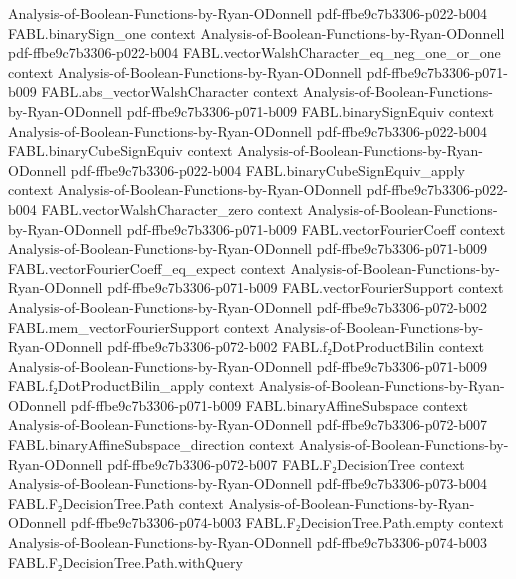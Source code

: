 \begin{theorem}
  {Analysis-of-Boolean-Functions-by-Ryan-ODonnell}
  {pdf-ffbe9c7b3306-p022-b004}
\proofstep
  {FABL.binarySign_one}
  {context}
  {Analysis-of-Boolean-Functions-by-Ryan-ODonnell}
  {pdf-ffbe9c7b3306-p022-b004}
\proofstep
  {FABL.vectorWalshCharacter_eq_neg_one_or_one}
  {context}
  {Analysis-of-Boolean-Functions-by-Ryan-ODonnell}
  {pdf-ffbe9c7b3306-p071-b009}
\proofstep
  {FABL.abs_vectorWalshCharacter}
  {context}
  {Analysis-of-Boolean-Functions-by-Ryan-ODonnell}
  {pdf-ffbe9c7b3306-p071-b009}
\proofstep
  {FABL.binarySignEquiv}
  {context}
  {Analysis-of-Boolean-Functions-by-Ryan-ODonnell}
  {pdf-ffbe9c7b3306-p022-b004}
\proofstep
  {FABL.binaryCubeSignEquiv}
  {context}
  {Analysis-of-Boolean-Functions-by-Ryan-ODonnell}
  {pdf-ffbe9c7b3306-p022-b004}
\proofstep
  {FABL.binaryCubeSignEquiv_apply}
  {context}
  {Analysis-of-Boolean-Functions-by-Ryan-ODonnell}
  {pdf-ffbe9c7b3306-p022-b004}
\proofstep
  {FABL.vectorWalshCharacter_zero}
  {context}
  {Analysis-of-Boolean-Functions-by-Ryan-ODonnell}
  {pdf-ffbe9c7b3306-p071-b009}
\proofstep
  {FABL.vectorFourierCoeff}
  {context}
  {Analysis-of-Boolean-Functions-by-Ryan-ODonnell}
  {pdf-ffbe9c7b3306-p071-b009}
\proofstep
  {FABL.vectorFourierCoeff_eq_expect}
  {context}
  {Analysis-of-Boolean-Functions-by-Ryan-ODonnell}
  {pdf-ffbe9c7b3306-p071-b009}
\proofstep
  {FABL.vectorFourierSupport}
  {context}
  {Analysis-of-Boolean-Functions-by-Ryan-ODonnell}
  {pdf-ffbe9c7b3306-p072-b002}
\proofstep
  {FABL.mem_vectorFourierSupport}
  {context}
  {Analysis-of-Boolean-Functions-by-Ryan-ODonnell}
  {pdf-ffbe9c7b3306-p072-b002}
\proofstep
  {FABL.f₂DotProductBilin}
  {context}
  {Analysis-of-Boolean-Functions-by-Ryan-ODonnell}
  {pdf-ffbe9c7b3306-p071-b009}
\proofstep
  {FABL.f₂DotProductBilin_apply}
  {context}
  {Analysis-of-Boolean-Functions-by-Ryan-ODonnell}
  {pdf-ffbe9c7b3306-p071-b009}
\proofstep
  {FABL.binaryAffineSubspace}
  {context}
  {Analysis-of-Boolean-Functions-by-Ryan-ODonnell}
  {pdf-ffbe9c7b3306-p072-b007}
\proofstep
  {FABL.binaryAffineSubspace_direction}
  {context}
  {Analysis-of-Boolean-Functions-by-Ryan-ODonnell}
  {pdf-ffbe9c7b3306-p072-b007}
\proofstep
  {FABL.F₂DecisionTree}
  {context}
  {Analysis-of-Boolean-Functions-by-Ryan-ODonnell}
  {pdf-ffbe9c7b3306-p073-b004}
\proofstep
  {FABL.F₂DecisionTree.Path}
  {context}
  {Analysis-of-Boolean-Functions-by-Ryan-ODonnell}
  {pdf-ffbe9c7b3306-p074-b003}
\proofstep
  {FABL.F₂DecisionTree.Path.empty}
  {context}
  {Analysis-of-Boolean-Functions-by-Ryan-ODonnell}
  {pdf-ffbe9c7b3306-p074-b003}
\proofstep
  {FABL.F₂DecisionTree.Path.withQuery}

\end{theorem}
